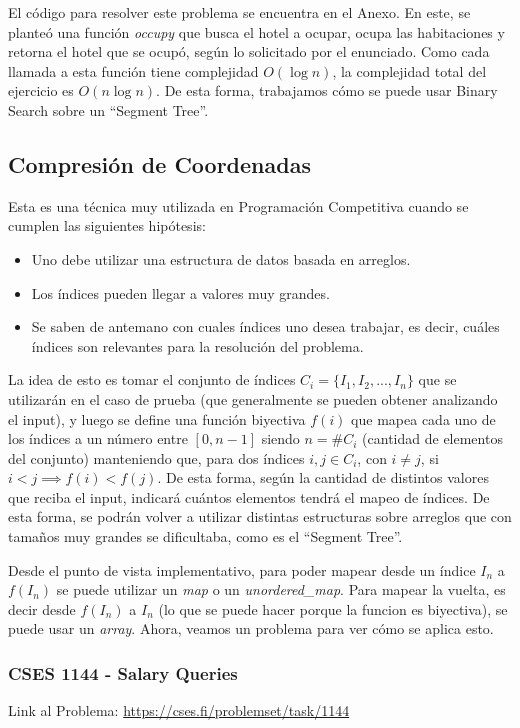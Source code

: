 \documentclass{article}
\begin{document}
El código para resolver este problema se encuentra en el Anexo. En este, se planteó una función \textit{occupy} que busca el hotel a ocupar, ocupa las habitaciones y retorna el hotel que se ocupó, según lo solicitado por el enunciado. Como cada llamada a esta función tiene complejidad $O(\log n)$, la complejidad total del ejercicio es $O(n \log n)$. De esta forma, trabajamos cómo se puede usar Binary Search sobre un ``Segment Tree''.

\subsection{Compresión de Coordenadas}

Esta es una técnica muy utilizada en Programación Competitiva cuando se cumplen las siguientes hipótesis:
\begin{itemize}
    \item Uno debe utilizar una estructura de datos basada en arreglos.
    \item Los índices pueden llegar a valores muy grandes.
    \item Se saben de antemano con cuales índices uno desea trabajar, es decir, cuáles índices son relevantes para la resolución del problema.
\end{itemize}
La idea de esto es tomar el conjunto de índices $C_i = \{I_1, I_2, ..., I_n\}$ que se utilizarán en el caso de prueba (que generalmente se pueden obtener analizando el input), y luego se define una función biyectiva $f(i)$ que mapea cada uno de los índices a un número entre $[0,n-1]$ siendo $n = \#C_i$ (cantidad de elementos del conjunto) manteniendo que, para dos índices $i,j\in C_i$, con $i\neq j$, si $i < j \implies f(i) < f(j)$. De esta forma, según la cantidad de distintos valores que reciba el input, indicará cuántos elementos tendrá el mapeo de índices. De esta forma, se podrán volver a utilizar distintas estructuras sobre arreglos que con tamaños muy grandes se dificultaba, como es el ``Segment Tree''.

Desde el punto de vista implementativo, para poder mapear desde un índice $I_n$ a $f(I_n)$ se puede utilizar un \textit{map} o un \textit{unordered\_map}. Para mapear la vuelta, es decir desde $f(I_n)$ a $I_n$ (lo que se puede hacer porque la funcion es biyectiva), se puede usar un \textit{array}. Ahora, veamos un problema para ver cómo se aplica esto.

\subsubsection{CSES 1144 - Salary Queries}
Link al Problema: \href{https://cses.fi/problemset/task/1144}{https://cses.fi/problemset/task/1144}
\end{document}
